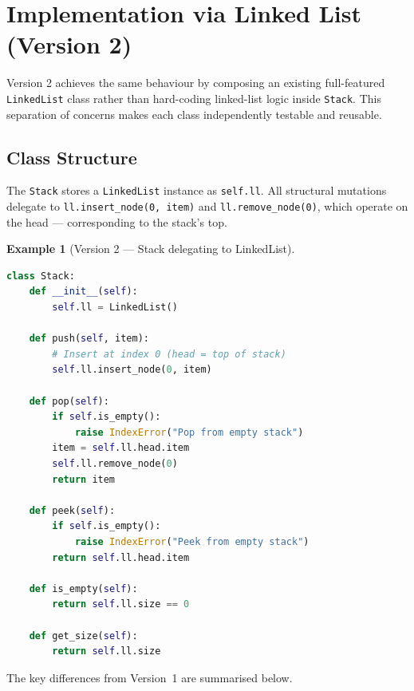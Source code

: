 \documentclass[11pt, a4paper, notitlepage]{report}
\theoremstyle{definition}
\theoremstyle{remark}
\theoremstyle{definition}
\newtheorem{example}[theorem]{Example}
\begin{document}
\section{Implementation via Linked List (Version 2)}
\label{sec:stack-impl-v2}

Version 2 achieves the same behaviour by composing an existing full-featured
\texttt{LinkedList} class rather than hard-coding linked-list logic inside
\texttt{Stack}. This separation of concerns makes each class independently
testable and reusable.

\subsection{Class Structure}
\label{subsec:stack-v2-classes}

The \texttt{Stack} stores a \texttt{LinkedList} instance as \texttt{self.ll}.
All structural mutations delegate to \texttt{ll.insert\_node(0, item)} and
\texttt{ll.remove\_node(0)}, which operate on the head --- corresponding to the
stack's top.

\begin{example}[Version 2 --- Stack delegating to LinkedList]
\label{ex:stack-v2}
\leavevmode
\begin{lstlisting}[language=Python]
class Stack:
    def __init__(self):
        self.ll = LinkedList()

    def push(self, item):
        # Insert at index 0 (head = top of stack)
        self.ll.insert_node(0, item)

    def pop(self):
        if self.is_empty():
            raise IndexError("Pop from empty stack")
        item = self.ll.head.item
        self.ll.remove_node(0)
        return item

    def peek(self):
        if self.is_empty():
            raise IndexError("Peek from empty stack")
        return self.ll.head.item

    def is_empty(self):
        return self.ll.size == 0

    def get_size(self):
        return self.ll.size
\end{lstlisting}
\end{example}

The key differences from Version~1 are summarised below.
\end{document}
